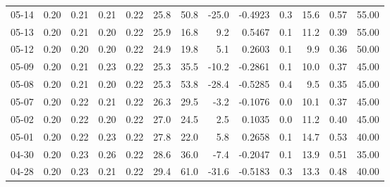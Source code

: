 \begin{threeparttable}
{\begin{tabular}{lrrrrrrrrrrrr}
  05-14 &          0.20 &          0.21 &          0.21 &        0.22 &                25.8 &                50.8 &      -25.0 &      -0.4923 &                 0.3 &             15.6 &            0.57 &                  55.00 \\
  05-13 &          0.20 &          0.21 &          0.20 &        0.22 &                25.9 &                16.8 &        9.2 &       0.5467 &                 0.1 &             11.2 &            0.39 &                  55.00 \\
  05-12 &          0.20 &          0.20 &          0.20 &        0.22 &                24.9 &                19.8 &        5.1 &       0.2603 &                 0.1 &              9.9 &            0.36 &                  50.00 \\
  05-09 &          0.20 &          0.21 &          0.23 &        0.22 &                25.3 &                35.5 &      -10.2 &      -0.2861 &                 0.1 &             10.0 &            0.37 &                  45.00 \\
  05-08 &          0.20 &          0.21 &          0.20 &        0.22 &                25.3 &                53.8 &      -28.4 &      -0.5285 &                 0.4 &              9.5 &            0.35 &                  45.00 \\
  05-07 &          0.20 &          0.22 &          0.21 &        0.22 &                26.3 &                29.5 &       -3.2 &      -0.1076 &                 0.0 &             10.1 &            0.37 &                  45.00 \\
  05-02 &          0.20 &          0.22 &          0.20 &        0.22 &                27.0 &                24.5 &        2.5 &       0.1035 &                 0.0 &             11.2 &            0.40 &                  45.00 \\
  05-01 &          0.20 &          0.22 &          0.23 &        0.22 &                27.8 &                22.0 &        5.8 &       0.2658 &                 0.1 &             14.7 &            0.53 &                  40.00 \\
  04-30 &          0.20 &          0.23 &          0.26 &        0.22 &                28.6 &                36.0 &       -7.4 &      -0.2047 &                 0.1 &             13.9 &            0.51 &                  35.00 \\
  04-28 &          0.20 &          0.23 &          0.21 &        0.22 &                29.4 &                61.0 &      -31.6 &      -0.5183 &                 0.3 &             13.3 &            0.48 &                  40.00 \\

\end{tabular}}
\end{threeparttable}
